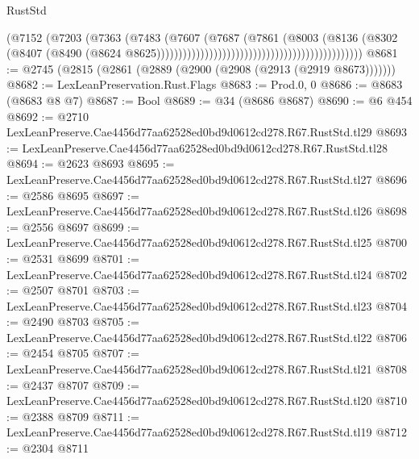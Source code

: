 \begin{lexlean}{RustStd}
\begin{coremodule}
                                                                        (@7152
                                                                          (@7203
                                                                            (@7363
                                                                              (@7483
                                                                                (@7607
                                                                                  (@7687
                                                                                    (@7861
                                                                                      (@8003
                                                                                        (@8136
                                                                                          (@8302
                                                                                            (@8407
                                                                                              (@8490
                                                                                                (@8624
                                                                                                  @8625)))))))))))))))))))))))))))))))))))))))))))))))
@8681 := @2745 (@2815 (@2861 (@2889 (@2900 (@2908 (@2913 (@2919 @8673)))))))
@8682 := LexLeanPreservation.Rust.Flags
@8683 := Prod.{0, 0}
@8686 := @8683 (@8683 @8 @7)
@8687 := Bool
@8689 := @34 (@8686 @8687)
@8690 := @6 @454
@8692 := @2710 LexLeanPreserve.Cae4456d77aa62528ed0bd9d0612cd278.R67.RustStd.tl29
@8693 := LexLeanPreserve.Cae4456d77aa62528ed0bd9d0612cd278.R67.RustStd.tl28
@8694 := @2623 @8693
@8695 := LexLeanPreserve.Cae4456d77aa62528ed0bd9d0612cd278.R67.RustStd.tl27
@8696 := @2586 @8695
@8697 := LexLeanPreserve.Cae4456d77aa62528ed0bd9d0612cd278.R67.RustStd.tl26
@8698 := @2556 @8697
@8699 := LexLeanPreserve.Cae4456d77aa62528ed0bd9d0612cd278.R67.RustStd.tl25
@8700 := @2531 @8699
@8701 := LexLeanPreserve.Cae4456d77aa62528ed0bd9d0612cd278.R67.RustStd.tl24
@8702 := @2507 @8701
@8703 := LexLeanPreserve.Cae4456d77aa62528ed0bd9d0612cd278.R67.RustStd.tl23
@8704 := @2490 @8703
@8705 := LexLeanPreserve.Cae4456d77aa62528ed0bd9d0612cd278.R67.RustStd.tl22
@8706 := @2454 @8705
@8707 := LexLeanPreserve.Cae4456d77aa62528ed0bd9d0612cd278.R67.RustStd.tl21
@8708 := @2437 @8707
@8709 := LexLeanPreserve.Cae4456d77aa62528ed0bd9d0612cd278.R67.RustStd.tl20
@8710 := @2388 @8709
@8711 := LexLeanPreserve.Cae4456d77aa62528ed0bd9d0612cd278.R67.RustStd.tl19
@8712 := @2304 @8711

\end{coremodule}
\end{lexlean}
